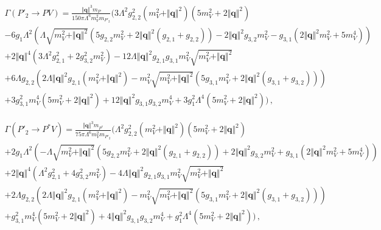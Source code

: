 \documentclass{article}
\begin{document}
\begin{multline}
  \Gamma\left( P'_2 \to P V \right) = \frac{\Vert\mathbf{q}\Vert^3 m_P}{150 \pi  \Lambda ^6 m_V^2 m_{P'_2}} \Bigg(3 \Lambda ^2 g_{2,2}^2 \left(m_V^2+\Vert\mathbf{q}\Vert^2\right) \left(5 m_V^2+2 \Vert\mathbf{q}\Vert^2\right) \\
    -6 g_1 \Lambda^2 \left(\Lambda \sqrt{m_V^2+\Vert\mathbf{q}\Vert^2} \left(5 g_{2,2} m_V^2+2 \Vert\mathbf{q}\Vert^2 \left(g_{2,1}+g_{2,2}\right)\right)-2 \Vert\mathbf{q}\Vert^2 g_{3,2} m_V^2-g_{3,1} \left(2 \Vert\mathbf{q}\Vert^2 m_V^2+5 m_V^4\right)\right) \\
    +2 \Vert\mathbf{q}\Vert^4 \left(3 \Lambda ^2 g_{2,1}^2+2 g_{3,2}^2 m_V^2\right)-12 \Lambda  \Vert\mathbf{q}\Vert^2 g_{2,1} g_{3,1} m_V^2 \sqrt{m_V^2+\Vert\mathbf{q}\Vert^2} \\
  +6 \Lambda g_{2,2} \left(2 \Lambda  \Vert\mathbf{q}\Vert^2 g_{2,1} \left(m_V^2+\Vert\mathbf{q}\Vert^2\right)-m_V^2 \sqrt{m_V^2+\Vert\mathbf{q}\Vert^2} \left(5 g_{3,1} m_V^2+2 \Vert\mathbf{q}\Vert^2 \left(g_{3,1}+g_{3,2}\right)\right)\right) \\
+3 g_{3,1}^2 m_V^4 \left(5 m_V^2+2 \Vert\mathbf{q}\Vert^2\right)+12 \Vert\mathbf{q}\Vert^2 g_{3,1} g_{3,2} m_V^4+3 g_1^2 \Lambda ^4 \left(5 m_V^2+2 \Vert\mathbf{q}\Vert^2\right)\Bigg) \, ,
\end{multline}

\begin{multline}
  \Gamma\left( P'_2 \to P^* V \right) = \frac{\Vert\mathbf{q}\Vert^3 m_{P^*}}{75 \pi  \Lambda ^6 m_V^2 m_{P'_2}} \Bigg(\Lambda ^2 g_{2,2}^2 \left(m_V^2+\Vert\mathbf{q}\Vert^2\right) \left(5 m_V^2+2 \Vert\mathbf{q}\Vert^2\right) \\
  +2 g_1 \Lambda ^2 \left(-\Lambda  \sqrt{m_V^2+\Vert\mathbf{q}\Vert^2} \left(5 g_{2,2} m_V^2+2 \Vert\mathbf{q}\Vert^2 \left(g_{2,1}+g_{2,2}\right)\right)+2 \Vert\mathbf{q}\Vert^2 g_{3,2} m_V^2+g_{3,1} \left(2 \Vert\mathbf{q}\Vert^2 m_V^2+5 m_V^4\right)\right) \\
  +2 \Vert\mathbf{q}\Vert^4 \left(\Lambda ^2 g_{2,1}^2+4 g_{3,2}^2 m_V^2\right)-4 \Lambda  \Vert\mathbf{q}\Vert^2 g_{2,1} g_{3,1} m_V^2 \sqrt{m_V^2+\Vert\mathbf{q}\Vert^2} \\
  +2 \Lambda  g_{2,2} \left(2 \Lambda  \Vert\mathbf{q}\Vert^2 g_{2,1} \left(m_V^2+\Vert\mathbf{q}\Vert^2\right)-m_V^2 \sqrt{m_V^2+\Vert\mathbf{q}\Vert^2} \left(5 g_{3,1} m_V^2+2 \Vert\mathbf{q}\Vert^2 \left(g_{3,1}+g_{3,2}\right)\right)\right) \\
  +g_{3,1}^2 m_V^4 \left(5 m_V^2+2 \Vert\mathbf{q}\Vert^2\right)+4 \Vert\mathbf{q}\Vert^2 g_{3,1} g_{3,2} m_V^4+g_1^2 \Lambda ^4 \left(5 m_V^2+2 \Vert\mathbf{q}\Vert^2\right)\Bigg) \, ,
\end{multline}
\end{document}
